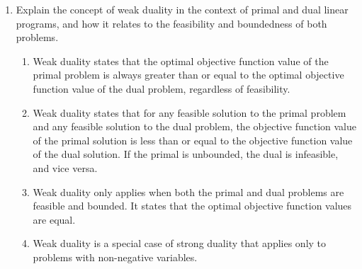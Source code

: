 \documentclass{article}%
\begin{document}
\begin{enumerate}
\begin{enumerate}
\begin{enumerate}
\item 1%
\item 9/2%
\item 5/2%
\item 7/2%
\end{enumerate}%
\vspace{0.5em}%
\item Is the solution $y = \begin{pmatrix} 1/2 \\ 1/2 \end{pmatrix}$ feasible for the dual problem (D)? Show your work.%
\begin{enumerate}%
\item Yes%
\item No%
\item Cannot be determined%
\item Only if $c = \begin{pmatrix} 1 \\ 1 \end{pmatrix}$%
\item Only if $b = \begin{pmatrix} 2 \\ 2 \end{pmatrix}$%
\end{enumerate}%
\vspace{0.5em}%
\end{enumerate}%
\item Explain the concept of weak duality in the context of primal and dual linear programs, and how it relates to the feasibility and boundedness of both problems.%
\begin{enumerate}%
\item Weak duality states that the optimal objective function value of the primal problem is always greater than or equal to the optimal objective function value of the dual problem, regardless of feasibility.%
\item Weak duality states that for any feasible solution to the primal problem and any feasible solution to the dual problem, the objective function value of the primal solution is less than or equal to the objective function value of the dual solution.  If the primal is unbounded, the dual is infeasible, and vice versa.%
\item Weak duality only applies when both the primal and dual problems are feasible and bounded. It states that the optimal objective function values are equal.%
\item Weak duality is a special case of strong duality that applies only to problems with non-negative variables.%

\end{enumerate}
\end{enumerate}
\end{document}
